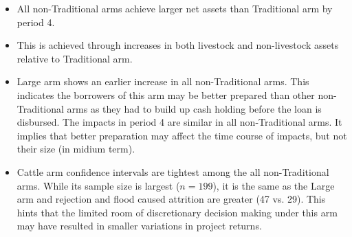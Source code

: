 \begin{itemize}
\vspace{1.0ex}\setlength{\itemsep}{1.0ex}\setlength{\baselineskip}{12pt}
\item	All non-\textsf{Traditional} arms achieve larger net assets than \textsf{Traditional} arm by period 4.
\item	This is achieved through increases in both livestock and non-livestock assets relative to \textsf{Traditional} arm.
\item	\textsf{Large} arm shows an earlier increase in all non-\textsf{Traditional} arms. This indicates the borrowers of this arm may be better prepared than other non-\textsf{Traditional} arms as they had to build up cash holding before the loan is disbursed. The impacts in period 4 are similar in all non-\textsf{Traditional} arms. It implies that better preparation may affect the time course of impacts, but not their size (in midium term). 
\item	\textsf{Cattle} arm confidence intervals are tightest among the all non-\textsf{Traditional} arms. While its sample size is largest ($n=199$), it is the same as the \textsf{Large} arm and rejection and flood caused attrition are greater (47 vs. 29). This hints that the limited room of discretionary decision making under this arm may have resulted in smaller variations in project returns. 
\end{itemize}

